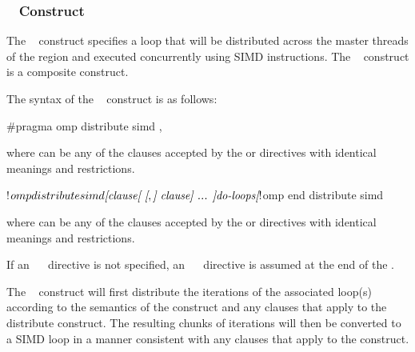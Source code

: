 \subsubsection{~ Construct}
\label{subsec:distribute simd Construct}
\summary
The ~ construct specifies a loop that will be distributed across the
master threads of the  region and executed concurrently using SIMD instructions. The ~ construct is a composite construct.

\syntax
The syntax of the ~ construct is as follows:

\begin{ccppspecific}
\begin{ompcPragma}
#pragma omp distribute simd \plc{[clause[ [},\plc{] clause] ... ] newline}
\end{ompcPragma}

where  can be any of the clauses accepted by the  or 
directives with identical meanings and restrictions.
\end{ccppspecific}

\begin{fortranspecific}
\begin{ompfPragma}
!$omp distribute simd \plc{[clause[ [},\plc{] clause] ... ]}
   \plc{do-loops}
\plc{[}!$omp end distribute simd\plc{]}
\end{ompfPragma}

where  can be any of the clauses accepted by the  or 
directives with identical meanings and restrictions.

If an ~~ directive is not specified, an ~~
directive is assumed at the end of the .
\end{fortranspecific}

\descr
The ~ construct will first distribute the iterations of the associated
loop(s) according to the semantics of the  construct and any clauses that
apply to the distribute construct. The resulting chunks of iterations will then be
converted to a SIMD loop in a manner consistent with any clauses that apply to the
 construct.


